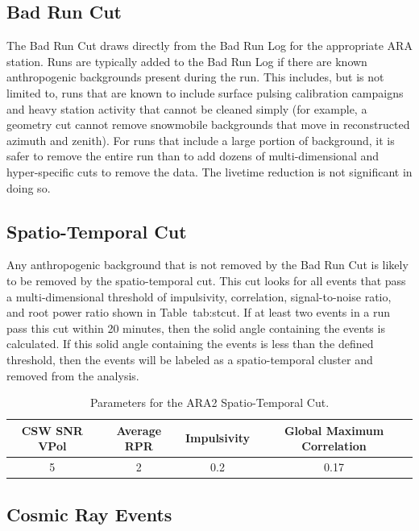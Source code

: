   \subsection{Bad Run Cut}
    
    The Bad Run Cut draws directly from the Bad Run Log for the appropriate ARA station. 
    Runs are typically added to the Bad Run Log if there are known anthropogenic backgrounds present during the run. 
    This includes, but is not limited to, runs that are known to include surface pulsing calibration campaigns and heavy station activity that cannot be cleaned simply (for example, a geometry cut cannot remove snowmobile backgrounds that move in reconstructed azimuth and zenith). 
    For runs that include a large portion of background, it is safer to remove the entire run than to add dozens of multi-dimensional and hyper-specific cuts to remove the data. 
    The livetime reduction is not significant in doing so. 
    
  \subsection{Spatio-Temporal Cut}
  
    Any anthropogenic background that is not removed by the Bad Run Cut is likely to be removed by the spatio-temporal cut. 
    This cut looks for all events that pass a multi-dimensional threshold of impulsivity, correlation, signal-to-noise ratio, and root power ratio shown in Table~{tab:stcut}. 
    If at least two events in a run pass this cut within 20 minutes, then the solid angle containing the events is calculated. 
    If this solid angle containing the events is less than the defined threshold, then the events will be labeled as a spatio-temporal cluster and removed from the analysis. 
    
    
    \begin{table}
      \centering
      \begin{tabular}{ c c c c }
        CSW SNR VPol & Average RPR & Impulsivity & Global Maximum Correlation \\
        \hline
        5 & 2 & 0.2 & 0.17
      \end{tabular}
      \caption{Parameters for the ARA2 Spatio-Temporal Cut. }
      \label{tab:stcut}
    \end{table}
    
  \subsection{Cosmic Ray Events}


